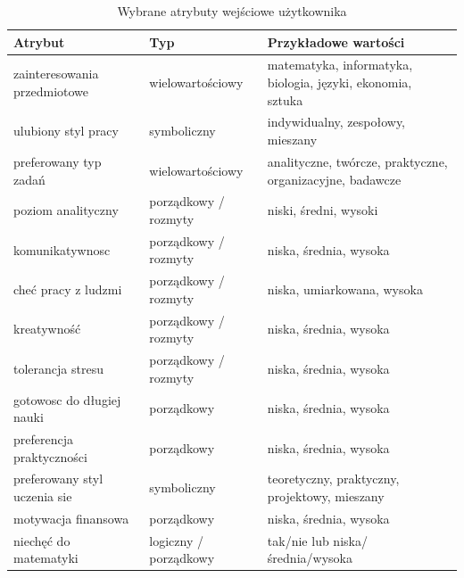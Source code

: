 \documentclass[12pt,a4paper,oneside]{article}
\begin{document}
\begin{table}[H]
\centering
\caption{Wybrane atrybuty wejściowe użytkownika}
\begin{tabular}{>{\raggedright\arraybackslash}p{4.6cm} >{\raggedright\arraybackslash}p{3.2cm} >{\raggedright\arraybackslash}p{6.2cm}}
\toprule
\textbf{Atrybut} & \textbf{Typ} & \textbf{Przykładowe wartości} \\
\midrule
zainteresowania przedmiotowe & wielowartościowy & matematyka, informatyka, biologia, języki, ekonomia, sztuka \\
ulubiony styl pracy & symboliczny & indywidualny, zespołowy, mieszany \\
preferowany typ zadań & wielowartościowy & analityczne, twórcze, praktyczne, organizacyjne, badawcze \\
poziom analityczny & porządkowy / rozmyty & niski, średni, wysoki \\
komunikatywnosc & porządkowy / rozmyty & niska, średnia, wysoka \\
cheć pracy z ludzmi & porządkowy / rozmyty & niska, umiarkowana, wysoka \\
kreatywność & porządkowy / rozmyty & niska, średnia, wysoka \\
tolerancja stresu & porządkowy / rozmyty & niska, średnia, wysoka \\
gotowosc do długiej nauki & porządkowy & niska, średnia, wysoka \\
preferencja praktyczności & porządkowy & niska, średnia, wysoka \\
preferowany styl uczenia sie & symboliczny & teoretyczny, praktyczny, projektowy, mieszany \\
motywacja finansowa & porządkowy & niska, średnia, wysoka \\
niechęć do matematyki & logiczny / porządkowy & tak/nie lub niska/średnia/wysoka \\
\bottomrule
\end{tabular}
\end{table}
\end{document}
